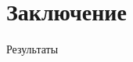 \documentclass[aspectratio=169]{beamer}
\begin{document}




\section{Заключение}

\begin{frame}{Результаты}


\end{frame}
\end{document}
